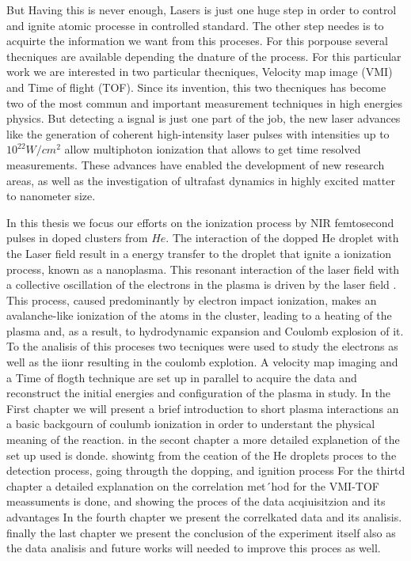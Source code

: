 But Having this is never enough, Lasers is just one huge step in order to control and ignite atomic processe in controlled standard. The other step needes is to acquirte the information we want from this proceses. For this porpouse several thecniques are available  depending the dnature of the process. For this particular  work we are interested in two particular thecniques, Velocity map image (VMI) and Time of flight (TOF).
Since its invention, this two thecniques has become two of the most commun and important measurement techniques in high energies physics. But detecting a isgnal is just one part of the job, the new laser advances like the  generation of coherent high-intensity laser pulses with intensities up to $10^{22} W/cm^{2}$  allow multiphoton ionization that allows to get time resolved measurements. These advances have enabled the development of new research areas, as well as the investigation of ultrafast dynamics in highly excited matter to nanometer size.

In this thesis we focus our efforts  on the ionization process by NIR femtosecond pulses in doped clusters from
$He$. The interaction of the dopped He droplet with the Laser field result in a energy transfer to the droplet  that ignite a ionization process, known as a nanoplasma. This resonant interaction of the laser field with a collective oscillation of the electrons in the plasma is driven by the laser field \cite{fennel_laser-driven_2010}. This process, caused predominantly by electron impact ionization, makes an avalanche-like ionization of the atoms in the cluster, leading to a heating of the plasma and, as a result, to hydrodynamic expansion and Coulomb explosion of it. To the analisis of this proceses two tecniques were used to study the electrons as well as the iionr resulting in the coulomb explotion. A velocity map imaging and a Time of flogth technique are set up in parallel to acquire the data and reconstruct the initial energies and configuration of the plasma in study. 
In the First chapter we will present a brief introduction to short plasma interactions an a basic backgourn of coulumb ionization in order to understant the physical meaning of the reaction.
in the secont chapter a more detailed explanetion of the set up used is donde. showintg from the ceation of the He droplets proces to the detection process, going througth the dopping, and ignition process
For the thirtd chapter a detailed explanation on the correlation met´hod for the VMI-TOF meassuments is done, and showing the proces of the data acqiuisitzion and its advantages
In the fourth chapter we present the correlkated data and its analisis. finally the last chapter we present the conclusion of the experiment itself also as the data analisis and future works will needed to improve this proces as well.


